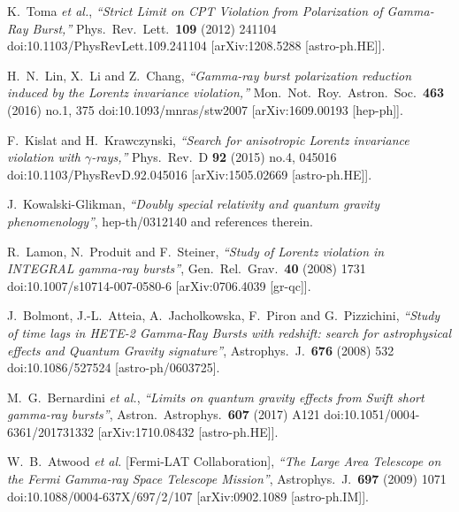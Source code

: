 \documentclass[12pt]{article}
\begin{document}
{\begin{thebibliography}{99}
  K.~Toma {\it et al.},
  {\it ``Strict Limit on CPT Violation from Polarization of Gamma-Ray Burst,''}
  Phys.\ Rev.\ Lett.\  {\bf 109} (2012) 241104
  doi:10.1103/PhysRevLett.109.241104
  [arXiv:1208.5288 [astro-ph.HE]].

  H.~N.~Lin, X.~Li and Z.~Chang,
  {\it ``Gamma-ray burst polarization reduction induced by the Lorentz invariance violation,''}
  Mon.\ Not.\ Roy.\ Astron.\ Soc.\  {\bf 463} (2016) no.1,  375
  doi:10.1093/mnras/stw2007
  [arXiv:1609.00193 [hep-ph]].

  F.~Kislat and H.~Krawczynski,
  {\it ``Search for anisotropic Lorentz invariance violation with $\gamma$-rays,''}
  Phys.\ Rev.\ D {\bf 92} (2015) no.4,  045016
  doi:10.1103/PhysRevD.92.045016
  [arXiv:1505.02669 [astro-ph.HE]].

 J.~Kowalski-Glikman,
  {\it ``Doubly special relativity and quantum gravity phenomenology''},
  hep-th/0312140 and references therein.

  R.~Lamon, N.~Produit and F.~Steiner,
  {\it ``Study of Lorentz violation in INTEGRAL gamma-ray bursts''},
  Gen.\ Rel.\ Grav.\  {\bf 40} (2008) 1731
  doi:10.1007/s10714-007-0580-6
  [arXiv:0706.4039 [gr-qc]].

  J.~Bolmont, J.-L.~Atteia, A.~Jacholkowska, F.~Piron and G.~Pizzichini,
  {\it ``Study of time lags in HETE-2 Gamma-Ray Bursts with redshift: search for astrophysical effects and Quantum Gravity signature''},
  Astrophys.\ J.\  {\bf 676} (2008) 532
  doi:10.1086/527524
  [astro-ph/0603725].

  M.~G.~Bernardini {\it et al.},
  {\it ``Limits on quantum gravity effects from Swift short gamma-ray bursts''},
  Astron.\ Astrophys.\  {\bf 607} (2017) A121
  doi:10.1051/0004-6361/201731332
  [arXiv:1710.08432 [astro-ph.HE]].
%

  W.~B.~Atwood {\it et al.} [Fermi-LAT Collaboration],
  {\it ``The Large Area Telescope on the Fermi Gamma-ray Space Telescope Mission''},
  Astrophys.\ J.\  {\bf 697} (2009) 1071
  doi:10.1088/0004-637X/697/2/107
  [arXiv:0902.1089 [astro-ph.IM]].
%


\end{thebibliography}}
\end{document}
